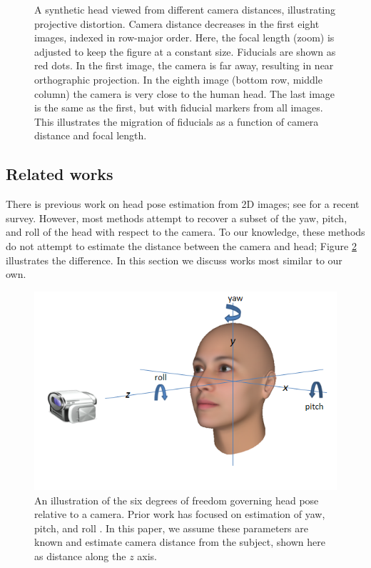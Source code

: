 \documentclass[runningheads]{llncs}
\begin{document}
\begin{figure}[ht!]
\begin{tabular}{ccc}
\end{tabular}
\caption{
A synthetic head viewed from different camera distances, illustrating projective distortion.
Camera distance decreases in the first eight images, indexed in row-major order.
Here, the focal length (zoom) is adjusted to keep the figure at a constant size.
Fiducials are shown as red dots.
In the first image, the camera is far away, resulting in near orthographic projection.
In the eighth image (bottom row, middle column) the camera is very close to the human head.  
The last image is the same as the first, but with fiducial markers from all images.
This illustrates the migration of fiducials as a function of camera distance and focal length. 
} 
\label{fig:fiducial_migration}
\end{figure}

\subsection{Related works} \label{sec:related}
There is previous work on head pose estimation from 2D images; see \cite{murphy2009head} for a recent survey.
However, most methods attempt to recover a subset of the yaw, pitch, and roll of the head with respect to the camera.
To our knowledge, these methods do not attempt to estimate the distance between the camera and head; Figure \ref{fig:head_pose} illustrates the difference.
In this section we discuss works most similar to our own.

\begin{figure}[ht]
\centering
\includegraphics[width=1.0\linewidth]{resources/figures/head_pose.png}
\caption{
An illustration of the six degrees of freedom governing head pose relative to a camera.
Prior work has focused on estimation of yaw, pitch, and roll \cite{murphy2009head}.
In this paper, we assume these parameters are known and estimate camera distance from the subject, shown here as distance along the $z$ axis.
}
\label{fig:head_pose}
\end{figure}
\end{document}
